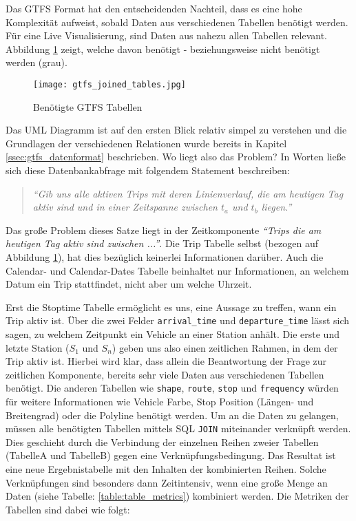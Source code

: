   Das GTFS Format hat den entscheidenden Nachteil, dass es eine hohe Komplexität aufweist, sobald Daten aus verschiedenen Tabellen benötigt werden. Für eine Live Visualisierung, sind Daten aus nahezu allen Tabellen relevant. Abbildung \ref{fig:gtfs_joined_tables} zeigt, welche davon benötigt - beziehungsweise nicht benötigt werden (grau).

  \begin{figure}[ht]
    \begin{center}
      \texttt{[image: gtfs\_joined\_tables.jpg]}
      \caption{Benötigte GTFS Tabellen\parencite{google_gtfs_reference}}
      \label{fig:gtfs_joined_tables}
    \end{center}
  \end{figure}

  Das UML Diagramm ist auf den ersten Blick relativ simpel zu verstehen und die Grundlagen der verschiedenen Relationen wurde bereits in Kapitel \ref{ssec:gtfs_datenformat} beschrieben. Wo liegt also das Problem? In Worten ließe sich diese Datenbankabfrage mit folgendem Statement beschreiben: 

  \begin{quote}
    \label{query_statement}
    \textit{"`Gib uns alle aktiven Trips mit deren Linienverlauf, die am heutigen Tag aktiv sind und in einer Zeitspanne zwischen $t_a$ und $t_b$ liegen."'}
  \end{quote}

  Das große Problem dieses Satze liegt in der Zeitkomponente \textit{"`Trips die am heutigen Tag aktiv sind zwischen ..."'}. Die Trip Tabelle selbst (bezogen auf Abbildung \ref{fig:gtfs_joined_tables}), hat dies bezüglich keinerlei Informationen darüber. Auch die Calendar- und Calendar-Dates Tabelle beinhaltet nur Informationen, an welchem Datum ein Trip stattfindet, nicht aber um welche Uhrzeit. 

  Erst die Stoptime Tabelle ermöglicht es uns, eine Aussage zu treffen, wann ein Trip aktiv ist. Über die zwei Felder \texttt{arrival\_time} und \texttt{departure\_time} lässt sich sagen, zu welchem Zeitpunkt ein Vehicle an einer Station anhält. Die erste und letzte Station ($S_1$ und $S_n$) geben uns also einen zeitlichen Rahmen, in dem der Trip aktiv ist.
  Hierbei wird klar, dass allein die Beantwortung der Frage zur zeitlichen Komponente, bereits sehr viele Daten aus verschiedenen Tabellen benötigt. Die anderen Tabellen wie \texttt{shape}, \texttt{route}, \texttt{stop} und \texttt{frequency} würden für weitere Informationen wie Vehicle Farbe, Stop Position (Längen- und Breitengrad) oder die Polyline benötigt werden. Um an die Daten zu gelangen, müssen alle benötigten Tabellen mittels SQL \texttt{JOIN} miteinander verknüpft werden. Dies geschieht durch die Verbindung der einzelnen Reihen zweier Tabellen (TabelleA und TabelleB) gegen eine Verknüpfungsbedingung. Das Resultat ist eine neue Ergebnistabelle mit den Inhalten der kombinierten Reihen. Solche Verknüpfungen sind besonders dann Zeitintensiv, wenn eine große Menge an Daten (siehe Tabelle: \ref{table:table_metrics}) kombiniert werden. Die Metriken der Tabellen sind dabei wie folgt:

